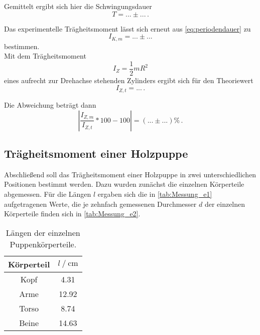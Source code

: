 Gemittelt ergibt sich hier die Schwingungsdauer
\begin{equation*}
  T = ... \pm ... \,.
\end{equation*}

Das experimentelle Trägheitsmoment lässt sich erneut aus \eqref{eq:periodendauer} zu
\begin{equation*}
  I_{K,m} = ... \pm ...
\end{equation*} 
bestimmen. \\

Mit dem Trägheitsmoment
\begin{equation}
  I_Z = \frac{1}{2} m R^2
\end{equation}
eines aufrecht zur Drehachse stehenden Zylinders ergibt sich für den Theoriewert
\begin{equation*}
  I_{Z,t} = ... \,.
\end{equation*}

Die Abweichung beträgt dann
\begin{equation*}
  \left|\frac{I_{Z,m}}{I_{Z,t}} * 100 - 100 \right| = (... \pm ...) \% \,.
\end{equation*}

\subsection{Trägheitsmoment einer Holzpuppe}
\label{subsec:e}

Abschließend soll das Trägheitsmoment einer Holzpuppe in zwei unterschiedlichen Positionen bestimmt werden. Dazu wurden zunächst die einzelnen Körperteile abgemessen.
Für die Längen $l$ ergaben sich die in \autoref{tab:Messung_e1} aufgetragenen Werte, die je zehnfach gemessenen Durchmesser $d$ der einzelnen Körperteile finden sich in \autoref{tab:Messung_e2}.

\begin{table}[H]
  \centering
  \begin{tabular}{S[table-format=2.0] S[table-format=2.2]}
      \toprule
      {Körperteil} & {$l \mathbin{/} \unit{\centi\meter}$}\\
      \midrule
        {Kopf}  & 4.31  \\
        {Arme}  & 12.92 \\
        {Torso} & 8.74 \\
        {Beine} & 14.63 \\
      \bottomrule
  \end{tabular}
  \caption{Längen der einzelnen Puppenkörperteile.}
  \label{tab:Messung_e1}
\end{table}

